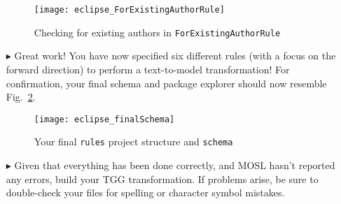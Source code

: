 \begin{itemize}
\begin{figure}[htbp]
\begin{center}
  \texttt{[image: eclipse\_ForExistingAuthorRule]}
  \caption{Checking for existing authors in \texttt{ForExistingAuthorRule}}
  \label{eclipse:ForExistingAuthorRule}
\end{center}
\end{figure}

\newpage

\item[$\blacktriangleright$] Great work! You have now specified six different rules (with a focus on the forward direction) to perform a text-to-model
transformation! For confirmation, your final schema and package explorer should now resemble Fig.~\ref{eclipse:schemaFinal}.

\vspace{0.5cm}

\begin{figure}[htbp]
\begin{center}
  \texttt{[image: eclipse\_finalSchema]}
  \caption{Your final \texttt{rules} project structure and \texttt{schema}}
  \label{eclipse:schemaFinal}
\end{center}
\end{figure}

\vspace{0.5cm}

\item[$\blacktriangleright$] Given that everything has been done correctly, and MOSL hasn't reported any errors, build your TGG transformation. If
problems arise, be sure to double-check your files for spelling or character symbol mistakes.

\end{itemize}
